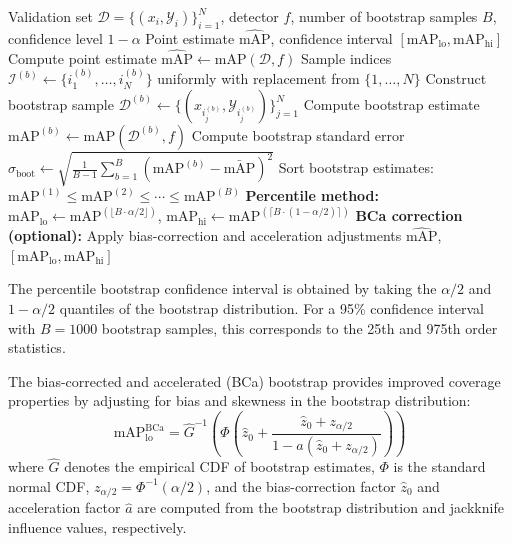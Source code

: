 \begin{algorithm}[t]
\caption{Bootstrap Confidence Interval for mAP}
\label{alg:bootstrap_confidence}
\begin{algorithmic}[1]
\Require Validation set $\mathcal{D} = \{(x_i, \mathcal{Y}_i)\}_{i=1}^{N}$, detector $f$, number of bootstrap samples $B$, confidence level $1 - \alpha$
\Ensure Point estimate $\widehat{\text{mAP}}$, confidence interval $[\text{mAP}_{\text{lo}}, \text{mAP}_{\text{hi}}]$
\State Compute point estimate $\widehat{\text{mAP}} \gets \text{mAP}(\mathcal{D}, f)$
    \State Sample indices $\mathcal{I}^{(b)} \gets \{i_1^{(b)}, \ldots, i_N^{(b)}\}$ uniformly with replacement from $\{1, \ldots, N\}$
    \State Construct bootstrap sample $\mathcal{D}^{(b)} \gets \{(x_{i_j^{(b)}}, \mathcal{Y}_{i_j^{(b)}})\}_{j=1}^{N}$
    \State Compute bootstrap estimate $\text{mAP}^{(b)} \gets \text{mAP}(\mathcal{D}^{(b)}, f)$
\EndFor
\State Compute bootstrap standard error $\hat{\sigma}_{\text{boot}} \gets \sqrt{\frac{1}{B-1} \sum_{b=1}^{B} (\text{mAP}^{(b)} - \bar{\text{mAP}})^2}$
\State Sort bootstrap estimates: $\text{mAP}^{(1)} \leq \text{mAP}^{(2)} \leq \cdots \leq \text{mAP}^{(B)}$
\State \textbf{Percentile method:} $\text{mAP}_{\text{lo}} \gets \text{mAP}^{(\lfloor B \cdot \alpha/2 \rfloor)}$, $\text{mAP}_{\text{hi}} \gets \text{mAP}^{(\lceil B \cdot (1-\alpha/2) \rceil)}$
\State \textbf{BCa correction (optional):} Apply bias-correction and acceleration adjustments
\State \Return $\widehat{\text{mAP}}$, $[\text{mAP}_{\text{lo}}, \text{mAP}_{\text{hi}}]$
\end{algorithmic}
\end{algorithm}

The percentile bootstrap confidence interval is obtained by taking the $\alpha/2$ and $1 - \alpha/2$ quantiles of the bootstrap distribution. For a 95\% confidence interval with $B = 1000$ bootstrap samples, this corresponds to the 25th and 975th order statistics.

The bias-corrected and accelerated (BCa) bootstrap provides improved coverage properties by adjusting for bias and skewness in the bootstrap distribution:
\begin{equation}
\text{mAP}_{\text{lo}}^{\text{BCa}} = \hat{G}^{-1}\left( \Phi\left( \hat{z}_0 + \frac{\hat{z}_0 + z_{\alpha/2}}{1 - \hat{a}(\hat{z}_0 + z_{\alpha/2})} \right) \right)
\label{eq:bca_lower}
\end{equation}
where $\hat{G}$ denotes the empirical CDF of bootstrap estimates, $\Phi$ is the standard normal CDF, $z_{\alpha/2} = \Phi^{-1}(\alpha/2)$, and the bias-correction factor $\hat{z}_0$ and acceleration factor $\hat{a}$ are computed from the bootstrap distribution and jackknife influence values, respectively.

